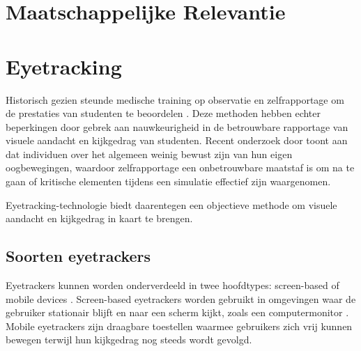 \section{Maatschappelijke Relevantie}


\section{Eyetracking}

Historisch gezien steunde medische training op observatie en zelfrapportage om de prestaties van studenten te beoordelen \autocite{PAUSZEK2023100031}. 
Deze methoden hebben echter beperkingen door gebrek aan nauwkeurigheid in de betrouwbare rapportage van visuele aandacht en kijkgedrag van studenten.
Recent onderzoek door \textcite{Alasdair2017} toont aan dat individuen over het algemeen weinig bewust zijn van hun eigen oogbewegingen, 
waardoor zelfrapportage een onbetrouwbare maatstaf is om na te gaan of kritische elementen tijdens een simulatie effectief zijn waargenomen.

Eyetracking-technologie biedt daarentegen een objectieve methode om visuele aandacht en kijkgedrag in kaart te brengen. 

\subsection{Soorten eyetrackers}

Eyetrackers kunnen worden onderverdeeld in twee hoofdtypes: screen-based of mobile devices \autocite{PAUSZEK2023100031}.
Screen-based eyetrackers worden gebruikt in omgevingen waar de gebruiker stationair blijft en naar een scherm kijkt, zoals een computermonitor .
Mobile eyetrackers zijn draagbare toestellen waarmee gebruikers zich vrij kunnen bewegen terwijl hun kijkgedrag nog steeds wordt gevolgd.


